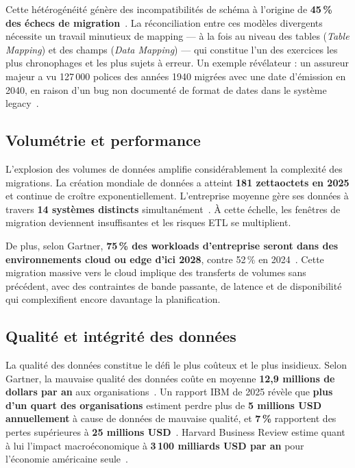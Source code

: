 Cette hétérogénéité génère des incompatibilités de schéma à l'origine de
\textbf{45\,\% des échecs de migration}~\cite{cloudficient2025}. La
réconciliation entre ces modèles divergents nécessite un travail minutieux
de mapping --- à la fois au niveau des tables (\textit{Table Mapping}) et
des champs (\textit{Data Mapping}) --- qui constitue l'un des exercices les
plus chronophages et les plus sujets à erreur. Un exemple révélateur : un
assureur majeur a vu 127\,000 polices des années 1940 migrées avec une date
d'émission en 2040, en raison d'un bug non documenté de format de dates dans
le système legacy~\cite{vovance_medium}.

\subsection{Volumétrie et performance}

L'explosion des volumes de données amplifie considérablement la complexité
des migrations. La création mondiale de données a atteint \textbf{181
zettaoctets en 2025} et continue de croître exponentiellement. L'entreprise
moyenne gère ses données à travers \textbf{14 systèmes distincts}
simultanément~\cite{kaopiz2025}. À cette échelle, les fenêtres de migration
deviennent insuffisantes et les risques ETL se multiplient.

De plus, selon Gartner, \textbf{75\,\% des workloads d'entreprise seront
dans des environnements cloud ou edge d'ici 2028}, contre 52\,\% en
2024~\cite{medhacloud2026}. Cette migration massive vers le cloud implique
des transferts de volumes sans précédent, avec des contraintes de bande
passante, de latence et de disponibilité qui complexifient encore davantage
la planification.

\subsection{Qualité et intégrité des données}

La qualité des données constitue le défi le plus coûteux et le plus
insidieux. Selon Gartner, la mauvaise qualité des données coûte en
moyenne \textbf{12,9 millions de dollars par an} aux
organisations~\cite{gartner_quality}. Un rapport IBM de 2025 révèle que
\textbf{plus d'un quart des organisations} estiment perdre plus de
\textbf{5 millions USD annuellement} à cause de données de mauvaise qualité,
et \textbf{7\,\%} rapportent des pertes supérieures à \textbf{25 millions
USD}~\cite{ibm_data_quality}. Harvard Business Review estime quant à lui
l'impact macroéconomique à \textbf{3\,100 milliards USD par an} pour
l'économie américaine seule~\cite{forbes_bad_data}.

